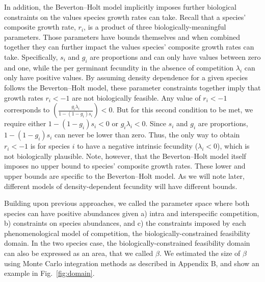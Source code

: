 In addition, the Beverton--Holt model implicitly imposes further biological constraints on the values species growth rates can take. Recall that a species' composite growth rate, $r_{i}$, is a product of three biologically-meaningful parameters. Those parameters have bounds themselves and when combined together they can further impact the values species' composite growth rates can take. Specifically, $s_{i}$ and $g_{i}$ are proportions and can only have values between zero and one, while the per germinant fecundity in the absence of competition $\lambda_{i}$ can only have positive values. By assuming density dependence for a given species follows the Beverton--Holt model, these parameter constraints together imply that growth rates $r_i < -1$ are not biologically feasible. Any value of $r_{i} < -1$ corresponds to $\left( \frac{g_{i}\lambda_{i}}{1-(1-g_{i})s_{i}} \right) < 0$. But for this second condition to be met, we require either $1-(1-g_{i})s_{i} < 0$ or $g_{i}\lambda_{i} < 0$. Since $s_{i}$ and $g_{i}$ are proportions, $1-(1-g_{i})s_{i}$ can never be lower than zero.  Thus, the only way to obtain $r_{i} < -1$ is for species $i$ to have a negative intrinsic fecundity ($\lambda_i < 0$), which is not biologically plausible. Note, however, that the Beverton--Holt model itself imposes no upper bound to species' composite growth rates. These lower and upper bounds are specific to the Beverton--Holt model. As we will note later, different models of density-dependent fecundity will have different bounds.


Building upon previous approaches, we called the parameter space where both species can have positive abundances given a) intra and interspecific competition, b) constraints on species abundances, and c) the constraints imposed by each phenomenological model of competition, the biologically-constrained feasibility domain. In the two species case,  the biologically-constrained feasibility domain can also be expressed as an area, that we called $\beta$. We estimated the size of $\beta$ using Monte Carlo integration methods as described in Appendix B, and show an example in Fig.~\ref{fig:domain}.

